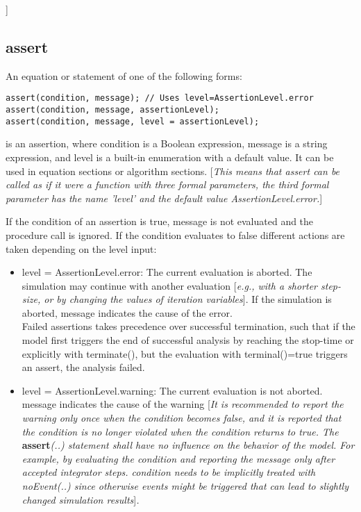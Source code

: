 {]}

\subsection{assert}

An equation or statement of one of the following forms:

\begin{lstlisting}[language=modelica]
assert(condition, message); // Uses level=AssertionLevel.error
assert(condition, message, assertionLevel);
assert(condition, message, level = assertionLevel);
\end{lstlisting}

is an assertion, where condition is a Boolean expression, message is a
string expression, and level is a built-in enumeration with a default
value. It can be used in equation sections or algorithm sections.
{[}\emph{This means that assert can be called as if it were a function
with three formal parameters, the third formal parameter has the name
'level' and the default value AssertionLevel.error.}{]}

If the condition of an assertion is true, message is not evaluated and
the procedure call is ignored. If the condition evaluates to false
different actions are taken depending on the level input:

\begin{itemize}
\item
  level = AssertionLevel.error: The current evaluation is aborted. The
  simulation may continue with another evaluation {[}\emph{e.g., with a
  shorter step-size, or by changing the values of iteration
  variables}{]}. If the simulation is aborted, message indicates the
  cause of the error.\\
  Failed assertions takes precedence over successful termination, such
  that if the model first triggers the end of successful analysis by
  reaching the stop-time or explicitly with terminate(), but the
  evaluation with terminal()=true triggers an assert, the analysis
  failed.
\item
  level = AssertionLevel.warning: The current evaluation is not aborted.
  message indicates the cause of the warning {[}\emph{It is recommended
  to report the warning only once when the condition becomes false, and
  it is reported that the condition is no longer violated when the
  condition returns to true. The} \textbf{assert}\emph{(..) statement
  shall have no influence on the behavior of the model. For example, by
  evaluating the condition and reporting the message only after accepted
  integrator steps. condition needs to be implicitly treated with
  noEvent(..) since otherwise events might be triggered that can lead to
  slightly changed simulation results}{]}\emph{.}
\end{itemize}

